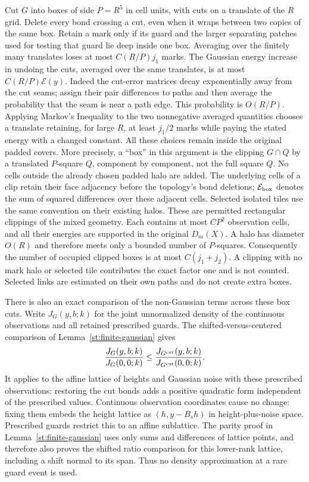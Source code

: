 Cut $G$ into boxes of side $P=R^5$ in cell units, with cuts on a
translate of the $R$ grid.  Delete every bond crossing a cut, even
when it wraps between two copies of the same box.  Retain a mark
only if its guard and the larger separating patches used for testing
that guard lie deep inside one box.  Averaging over the finitely many
translates loses at most $C(R/P)j_1$ marks.  The Gaussian energy
increase in undoing the cuts, averaged over the same translates, is
at most $C(R/P)\mathcal E(y)$.  Indeed the cut-error matrices decay
exponentially away from the cut seams; assign their pair differences
to paths and then average the probability that the seam is near a
path edge.  This probability is $O(R/P)$.  Applying Markov's
Inequality to the two nonnegative averaged quantities chooses a
translate retaining, for large $R$, at least $j_1/2$ marks while
paying the stated energy with a changed constant.  All these choices
remain inside the original padded covers.  More precisely, a ``box''
in this argument is the clipping $G\cap Q$ by a translated $P$-square
$Q$, component by component, not the full square $Q$.  No cells outside
the already chosen padded halo are added.  The underlying cells of a
clip retain their face adjacency before the topology's bond deletions;
$\mathcal E_{\rm box}$ denotes the sum of squared differences over
these adjacent cells.  Selected isolated tiles use the same convention
on their existing halos.  These are permitted rectangular clippings
of the mixed geometry.  Each contains at most $CP^2$ observation cells,
and all their energies are supported in the original $D_m(X)$.
A halo has diameter $O(R)$ and therefore meets only a bounded number
of $P$-squares.  Consequently the number of occupied clipped boxes is
at most $C(j_1+j_2)$.  A clipping with no mark halo or selected tile
contributes the exact factor one and is not counted.  Selected links
are estimated on their own paths and do not create extra boxes.

There is also an exact comparison of the non-Gaussian terms across
these box cuts.  Write $J_G(y,b;k)$ for the joint unnormalized density
of the continuous observations and all retained prescribed guards.
The shifted-versus-centered comparison of Lemma~\ref{st:finite-gaussian} gives
\begin{equation}\label{en:shifted-box}
       \frac{J_G(y,b;k)}{J_G(0,0;k)}
       \leq\frac{J_{G^{\rm cut}}(y,b;k)}{J_{G^{\rm cut}}(0,0;k)}.
\end{equation}
It applies to the affine lattice of heights and Gaussian noise with
these prescribed observations: restoring the cut bonds adds a
positive quadratic form independent of the prescribed values.
Continuous observation coordinates cause no change: fixing them
embeds the height lattice as $(h,y-B_sh)$ in height-plus-noise space.
Prescribed guards restrict this to an affine sublattice.  The parity
proof in Lemma~\ref{st:finite-gaussian} uses only sums and differences
of lattice points, and therefore also proves the shifted ratio
comparison for this lower-rank lattice, including a shift normal to
its span.  Thus no density approximation at a rare guard event is used.

